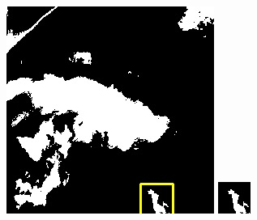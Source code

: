 \documentclass[UTF8]{ctexart}
\begin{document}
\begin{figure}[H]
{\begin{minipage}[b]{0.15\linewidth}
            \vspace{4pt}
            \includegraphics[width=1\linewidth]{../log/cut/LC81570452014213LGN00_06157_my.jpg}\vspace{4pt}
            \includegraphics[width=1\linewidth]{../log/cut/tmp_cut_LC81570452014213LGN00_06157_my.jpg}

\end{minipage}}
\end{figure}
\end{document}
